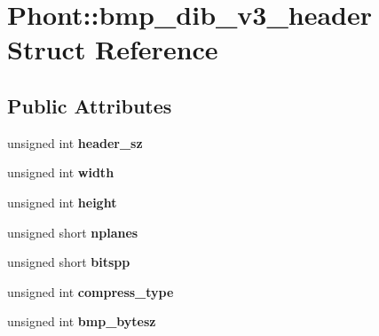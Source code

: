 \hypertarget{struct_phont_1_1bmp__dib__v3__header}{\section{Phont\-:\-:bmp\-\_\-dib\-\_\-v3\-\_\-header Struct Reference}
\label{struct_phont_1_1bmp__dib__v3__header}
}
\subsection*{Public Attributes}
\begin{DoxyCompactItemize}
\item 
\hypertarget{struct_phont_1_1bmp__dib__v3__header_a7d22ef728b1519ad1e1460857e5d022f}{unsigned int {\bfseries header\-\_\-sz}}\label{struct_phont_1_1bmp__dib__v3__header_a7d22ef728b1519ad1e1460857e5d022f}

\item 
\hypertarget{struct_phont_1_1bmp__dib__v3__header_a3269d95290a470490b80b418fd3c9750}{unsigned int {\bfseries width}}\label{struct_phont_1_1bmp__dib__v3__header_a3269d95290a470490b80b418fd3c9750}

\item 
\hypertarget{struct_phont_1_1bmp__dib__v3__header_a2760afba1725de193fbb0918146d1345}{unsigned int {\bfseries height}}\label{struct_phont_1_1bmp__dib__v3__header_a2760afba1725de193fbb0918146d1345}

\item 
\hypertarget{struct_phont_1_1bmp__dib__v3__header_a05259436f6e2ad52872752c777fd9391}{unsigned short {\bfseries nplanes}}\label{struct_phont_1_1bmp__dib__v3__header_a05259436f6e2ad52872752c777fd9391}

\item 
\hypertarget{struct_phont_1_1bmp__dib__v3__header_a7c7057cd571e242ddb1f591aa4bd9229}{unsigned short {\bfseries bitspp}}\label{struct_phont_1_1bmp__dib__v3__header_a7c7057cd571e242ddb1f591aa4bd9229}

\item 
\hypertarget{struct_phont_1_1bmp__dib__v3__header_a38d776df4d9201cd59b22e6c6cbfa09c}{unsigned int {\bfseries compress\-\_\-type}}\label{struct_phont_1_1bmp__dib__v3__header_a38d776df4d9201cd59b22e6c6cbfa09c}

\item 
\hypertarget{struct_phont_1_1bmp__dib__v3__header_ade73542038e7c20729dee7615ca2b9ae}{unsigned int {\bfseries bmp\-\_\-bytesz}}\label{struct_phont_1_1bmp__dib__v3__header_ade73542038e7c20729dee7615ca2b9ae}


\end{DoxyCompactItemize}
